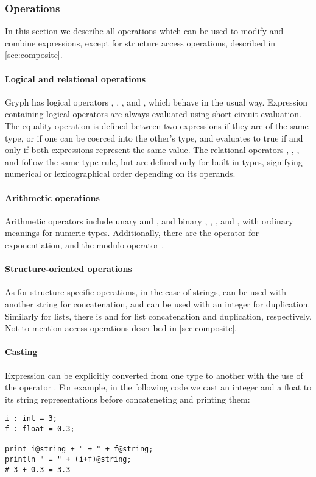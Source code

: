 \subsubsection{Operations}
\label{sec:operations}
In this section we describe all operations which can be used to modify and combine expressions, except for structure access operations, described in \ref{sec:composite}.

\paragraph{Logical and relational operations}
Gryph has logical operators , , , and , which behave in the usual way. Expression containing logical operators are always evaluated using short-circuit evaluation. The equality operation \key{==} is defined between two expressions if they are of the same type, or if one can be coerced into the other's type, and evaluates to true if and only if both expressions represent the same value. The relational operators \key{<}, \key{>}, \key{<=}, and \key{>=} follow the same type rule, but are defined only for built-in types, signifying numerical or lexicographical order depending on its operands.
\paragraph{Arithmetic operations}
Arithmetic operators include unary \key{-} and \key{+}, and binary \key{+}, \key{-}, \key{*}, and \key{/}, with ordinary meanings for numeric types. Additionally, there are the \key{\^} operator for exponentiation, and the modulo operator \key{\%}.
\paragraph{Structure-oriented operations}
As for structure-specific operations, in the case of strings, \key{+} can be used with another string for concatenation, and \key{*} can be used with an integer for duplication. Similarly for lists, there is \key{++} and \key{**} for list concatenation and duplication, respectively. Not to mention access operations described in \ref{sec:composite}.

\paragraph{Casting}
\label{sec:casting}
Expression can be explicitly converted from one type to another with the use of the operator . For example, in the following code we cast an integer and a float to its string representations before concateneting and printing them:
\begin{lstlisting}[language=Gryph]
i : int = 3;
f : float = 0.3;

print i@string + " + " + f@string;
println " = " + (i+f)@string;
# 3 + 0.3 = 3.3
\end{lstlisting}